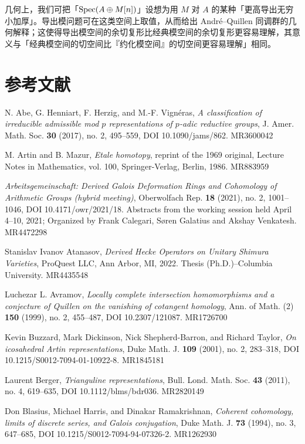 几何上，我们可把「$\operatorname{Spec}(A\oplus M[n])$」设想为用 $M$ 对 $A$ 的某种「更高导出无穷小加厚」。导出模问题可在这类空间上取值，从而给出 André--Quillen 同调群的几何解释；这使得导出模空间的余切复形比经典模空间的余切复形更容易理解，其意义与「经典模空间的切空间比『约化模空间』的切空间更容易理解」相同。

\section*{参考文献}

\begin{refs}
\item[{[AHHV17]}] N. Abe, G. Henniart, F. Herzig, and M.-F. Vign\'eras, \emph{A classification of irreducible admissible mod $p$ representations of $p$-adic reductive groups}, J. Amer. Math. Soc. \textbf{30} (2017), no. 2, 495--559, DOI 10.1090/jams/862. MR3600042
\item[{[AM86]}] M. Artin and B. Mazur, \emph{Etale homotopy}, reprint of the 1969 original, Lecture Notes in Mathematics, vol. 100, Springer-Verlag, Berlin, 1986. MR883959
\item[{[Arb21]}] \emph{Arbeitsgemeinschaft: Derived Galois Deformation Rings and Cohomology of Arithmetic Groups (hybrid meeting)}, Oberwolfach Rep. \textbf{18} (2021), no. 2, 1001--1046, DOI 10.4171/owr/2021/18. Abstracts from the working session held April 4--10, 2021; Organized by Frank Calegari, S\o ren Galatius and Akshay Venkatesh. MR4472298
\item[{[Ata22]}] Stanislav Ivanov Atanasov, \emph{Derived Hecke Operators on Unitary Shimura Varieties}, ProQuest LLC, Ann Arbor, MI, 2022. Thesis (Ph.D.)--Columbia University. MR4435548
\item[{[Avr99]}] Luchezar L. Avramov, \emph{Locally complete intersection homomorphisms and a conjecture of Quillen on the vanishing of cotangent homology}, Ann. of Math. (2) \textbf{150} (1999), no. 2, 455--487, DOI 10.2307/121087. MR1726700
\item[{[BDSBT01]}] Kevin Buzzard, Mark Dickinson, Nick Shepherd-Barron, and Richard Taylor, \emph{On icosahedral Artin representations}, Duke Math. J. \textbf{109} (2001), no. 2, 283--318, DOI 10.1215/S0012-7094-01-10922-8. MR1845181
\item[{[Ber11]}] Laurent Berger, \emph{Trianguline representations}, Bull. Lond. Math. Soc. \textbf{43} (2011), no. 4, 619--635, DOI 10.1112/blms/bdr036. MR2820149
\item[{[BHR94]}] Don Blasius, Michael Harris, and Dinakar Ramakrishnan, \emph{Coherent cohomology, limits of discrete series, and Galois conjugation}, Duke Math. J. \textbf{73} (1994), no. 3, 647--685, DOI 10.1215/S0012-7094-94-07326-2. MR1262930

\end{refs}
